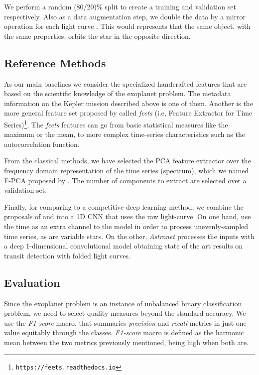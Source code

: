We perform a random (80/20)\% split to create a training and validation set respectively. Also as a data augmentation step, we double the data by a mirror operation for each light curve \citep{tiensuu2019detecting}. This would represents that the same object, with the same properties, orbits the star in the opposite direction.

\subsection{Reference Methods}
As our main baselines we consider the specialized handcrafted features that are based on the scientific knowledge of the exoplanet problem. The metadata information on the Kepler mission described above is one of them. Another is the more general feature set proposed by \citep{cabral2018fats} called \emph{feets} (i.e, Feature Extractor for Time Series)\footnote{\texttt{https://feets.readthedocs.io}}. The \emph{feets} features can go from basic statistical measures like the maximum or the mean, to more complex time-series characteristics such as the autocorrelation function.

From the classical methods, we have selected the PCA feature extractor over the frequency domain representation of the time series (spectrum), which we named F-PCA proposed by \citet{bugueno2018refining}. The number of components to extract are selected over a validation set.

Finally, for comparing to a competitive deep learning method, we combine the proposals of \citet{aguirre2019deep} and \citep{shallue2018identifying} into a 1D CNN that uses the raw light-curve. On one hand, \citet{aguirre2019deep} use the time as an extra channel to the model in order to process unevenly-sampled time series, as are variable stars. On the other, \textit{Astronet} \citep{shallue2018identifying} processes the inputs with a deep 1-dimensional convolutional model obtaining state of the art results on transit detection with folded light curves. 

\subsection{Evaluation}
Since the exoplanet problem is an instance of unbalanced binary classification problem, we need to select quality measures beyond the standard accuracy. We use the \textit{F1-score} macro, that summaries \textit{precision} and \textit{recall} metrics in just one value equitably through the classes. \textit{F1-score} macro is defined as the harmonic mean between the two metrics previously mentioned, being high when both are. 


